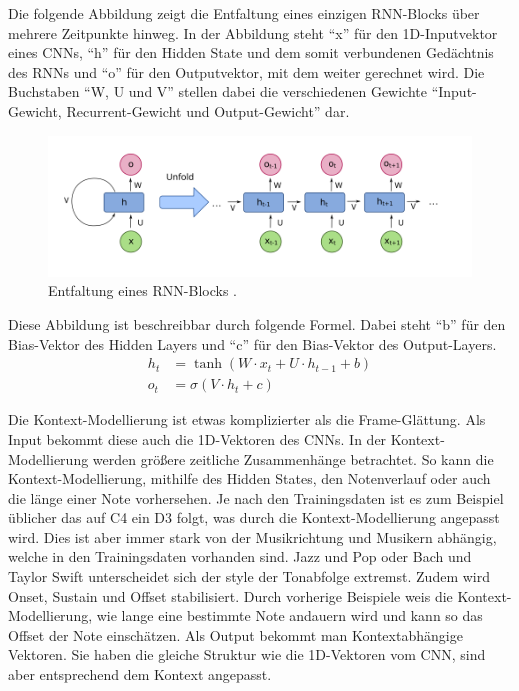 Die folgende Abbildung zeigt die Entfaltung eines einzigen RNN-Blocks über mehrere Zeitpunkte hinweg.
In der Abbildung steht \enquote{x} für den 1D-Inputvektor eines CNNs,
\enquote{h} für den Hidden State und dem somit verbundenen Gedächtnis des RNNs
und \enquote{o} für den Outputvektor, mit dem weiter gerechnet wird.
Die Buchstaben \enquote{W, U und V} stellen dabei die verschiedenen
Gewichte  \enquote{Input-Gewicht, Recurrent-Gewicht und Output-Gewicht} dar.
\begin{figure}[H]
    \centering
    \includegraphics[width=1\textwidth]{Graphics/rnn_unfold}
    \caption[Entfaltung eines RNN-Blocks]{Entfaltung eines RNN-Blocks \cite{wikimediaRNN}.}
    \label{fig:rnn_block_unfold}
\end{figure}
Diese Abbildung ist beschreibbar durch folgende Formel.
Dabei steht \enquote{b} für den Bias-Vektor des Hidden Layers und \enquote{c} für den Bias-Vektor des Output-Layers.
\begin{align*}
h_t &= \tanh\left( W \cdot x_t + U \cdot h_{t-1} + b \right) \\
o_t &= \sigma\left( V \cdot h_t + c \right)
\end{align*}

Die Kontext-Modellierung ist etwas komplizierter als die Frame-Glättung.
Als Input bekommt diese auch die 1D-Vektoren des CNNs.
In der Kontext-Modellierung werden größere zeitliche Zusammenhänge betrachtet.
So kann die Kontext-Modellierung, mithilfe des Hidden States,
den Notenverlauf oder auch die länge einer Note vorhersehen.
Je nach den Trainingsdaten ist es zum Beispiel üblicher das auf C4 ein D3 folgt,
was durch die Kontext-Modellierung angepasst wird.
Dies ist aber immer stark von der Musikrichtung und Musikern abhängig, welche in den Trainingsdaten vorhanden sind.
Jazz und Pop oder Bach und Taylor Swift unterscheidet sich der style der Tonabfolge extremst.
Zudem wird Onset, Sustain und Offset stabilisiert.
Durch vorherige Beispiele weis die Kontext-Modellierung,
wie lange eine bestimmte Note andauern wird und kann so das Offset der Note einschätzen.
Als Output bekommt man Kontextabhängige Vektoren.
Sie haben die gleiche Struktur wie die 1D-Vektoren vom CNN, sind aber entsprechend dem Kontext angepasst.

